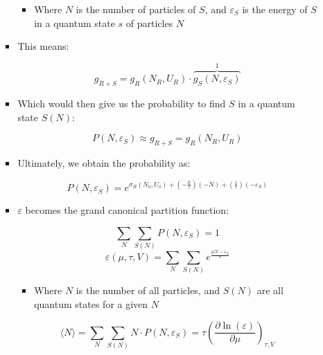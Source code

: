 \begin{itemize}
\begin{itemize}
\begin{itemize}
            \begin{itemize}

              \item Where $N$ is the number of particles of $S$, and $\varepsilon_S$ is the energy of $S$ in a quantum state $s$ of particles $N$

            \end{itemize}

          \item This means:

            $$g_{R+S}=g_R(N_R,U_R)\cdot \overbrace{g_S(N, \varepsilon_S)}^{1}$$

          \item Which would then give us the probability to find $S$ in a quantum state $S(N)$:

            $$P(N,\varepsilon_S)\approx g_{R+S}=g_R(N_R,U_R)$$

          \item Ultimately, we obtain the probability as:

            $$P(N,\varepsilon_S)=e^{\sigma_R(N_o,U_o)+\left( -\frac{\mu}{\tau}\right)(-N)+\left( \frac{1}{\tau} \right)\left( -\varepsilon_S \right)}$$

          \item $\varepsilon$ becomes the grand canonical partition function:

            $$\sum_N\sum_{S(N)}P(N,\varepsilon_S)=1$$
            $$\varepsilon(\mu,\tau,V)=\sum_N\sum_{S(N)} e^{\frac{\mu N-\varepsilon_S}{\tau}}$$

            \begin{itemize}

              \item Where $N$ is the number of all particles, and $S(N)$ are all quantum states for a given $N$

            \end{itemize}

            $$\langle N\rangle =\sum_N\sum_{S(N)}N\cdot P(N,\varepsilon_S)=\tau\left( \frac{\partial \ln(\varepsilon)}{\partial \mu} \right)_{\tau,V}$$

        \end{itemize}

    \end{itemize}

\end{itemize}






